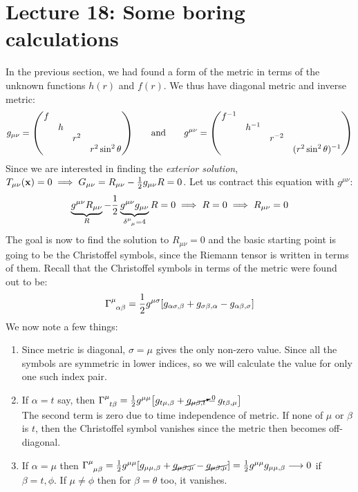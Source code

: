 \section*{Lecture 18: Some boring calculations}
In the previous section, we had found a form of the metric in terms of the unknown functions $h(r)$ and $f(r)$. We thus have diagonal metric and inverse metric:
$$g_{\mu\nu} = \mqty(f& & & \\ & h && \\ & & r^2&\\ & & & r^2\sin^2\theta)\qquad\text{and}\qquad g^{\mu\nu} = \mqty(f^{-1}& & & \\ & h^{-1} && \\ & & r^{-2}&\\ & & & (r^2\sin^2\theta)^{-1})$$
Since we are interested in finding the \textit{exterior solution}, $T_{\mu\nu} (\vb{{x}}) = 0\implies G_{\mu\nu}= R_{\mu\nu}-\frac{1}{2}g_{\mu\nu}R = 0$. Let us contract this equation with $g^{\mu\nu}$:
\begin{align*}
    \underbrace{g^{\mu\nu}R_{\mu\nu}}_{R} - \frac{1}{2}\underbrace{g^{\mu\nu}g_{\mu\nu}}_{\tensor{\delta}{^\mu _\mu}=4}R = 0 \implies R=0 \implies R_{\mu\nu} = 0
\end{align*}
The goal is now to find the solution to $\boxed{R_{\mu\nu}=0}$ and the basic starting point is going to be the Christoffel symbols, since the Riemann tensor is written in terms of them. Recall that the Christoffel symbols in terms of the metric were found out to be:
$$\chris{\mu}{\alpha}{\beta} = \frac{1}{2}g^{\mu\sigma}\qty[g_{\alpha\sigma,\beta}+g_{\sigma\beta,\alpha}-g_{\alpha\beta,\sigma}]$$
We now note a few things:
\begin{enumerate}
    \item Since metric is diagonal, $\sigma = \mu$ gives the only non-zero value. Since all the symbols are symmetric in lower indices, so we will calculate the value for only one such index pair.
    \item If $\alpha = t$ say, then $\chris{\mu}{t}{\beta} = \frac{1}{2}g^{\mu\mu} \qty[g_{t\mu,\beta}+\cancelto{0}{g_{\mu\beta,t}}-g_{t\beta,\mu}]$\\
    The second term is zero due to time independence of metric. If none of $\mu$ or $\beta$ is $t$, then the Christoffel symbol vanishes since the metric then becomes off-diagonal. 
    \item If $\alpha=\mu$ then $\chris{\mu}{\mu}{\beta} = \frac{1}{2}g^{\mu\mu} \qty[g_{\mu\mu,\beta} +\cancel{ g_{\mu\beta,\mu}} - \cancel{g_{\mu\beta,\mu}}] = \frac{1}{2} g^{\mu\mu}g_{\mu\mu,\beta}\longrightarrow 0 $ if $\beta = t,\phi$. If $\mu \neq \phi$ then for $\beta=\theta$ too, it vanishes.
\end{enumerate}
